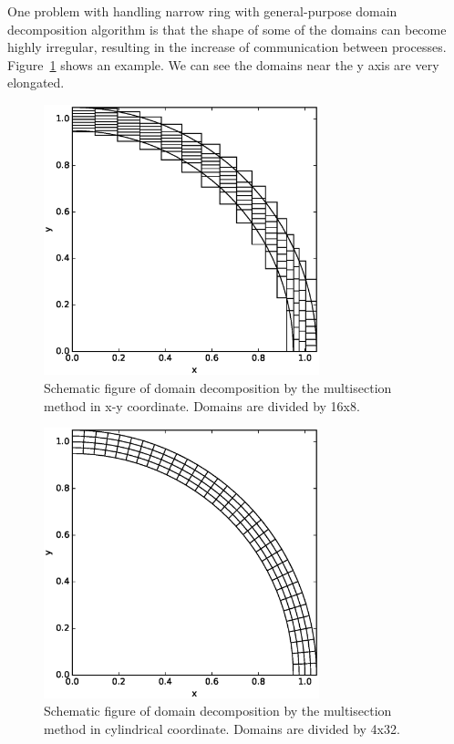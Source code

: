 \documentclass[oribibl]{llncs}
\begin{document}
One problem with handling narrow ring with general-purpose domain
decomposition algorithm is that the shape of some of the domains can
become highly irregular, resulting in the increase of communication
between processes. Figure~\ref{fig:domain_cart} shows an example. We
can see the domains near the y axis are very elongated.

\begin{figure}
  \centering \includegraphics[width=8cm,clip]{./fig/domain_cart.eps}
  \caption{Schematic figure of domain decomposition by the multisection
    method in x-y coordinate. Domains are divided by 16x8.}
  \label{fig:domain_cart}
\end{figure}

\begin{figure}
  \centering
    \includegraphics[width=8cm,clip]{./fig/domain_cyl.eps}
  \caption{Schematic figure of domain decomposition by the multisection
    method in cylindrical coordinate. Domains are divided by 4x32.}
  \label{fig:domain_cyl}
\end{figure}
\end{document}

